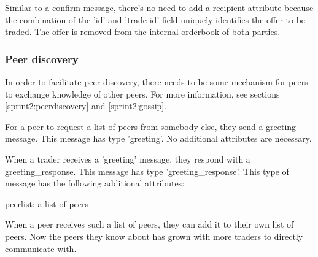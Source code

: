 Similar to a confirm message, there's no need to add a recipient attribute because the combination of the 'id' and 'trade-id' field uniquely identifies the offer to be traded.
The offer is removed from the internal orderbook of both parties.

\subsubsection{Peer discovery}

In order to facilitate peer discovery, there needs to be some mechanism for peers to exchange knowledge of other peers. For more information, see sections \ref{sprint2:peerdiscovery} and \ref{sprint2:gossip}.

For a peer to request a list of peers from somebody else, they send a greeting message.
This message has type 'greeting'.
No additional attributes are necessary.

When a trader receives a 'greeting' message, they respond with a greeting\_response.
This message has type 'greeting\_response'.
This type of message has the following additional attributes:
\begin{myitemize}
\item peerlist: a list of peers
\end{myitemize}

When a peer receives such a list of peers, they can add it to their own list of peers.
Now the peers they know about has grown with more traders to directly communicate with.